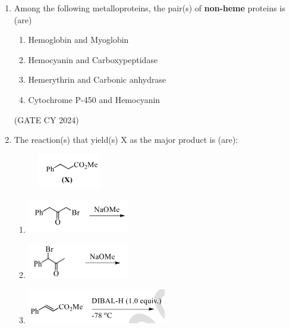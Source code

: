 \documentclass[12pt]{article}
\begin{document}
\begin{enumerate}
\item Among the following metalloproteins, the pair(s) of \textbf{non-heme} proteins is (are)

\begin{enumerate}
\item Hemoglobin and Myoglobin
\item Hemocyanin and Carboxypeptidase
\item Hemerythrin and Carbonic anhydrase
\item Cytochrome P-450 and Hemocyanin
\end{enumerate}
\hfill (GATE CY 2024)

\item The reaction(s) that yield(s) X as the major product is (are): 

\begin{figure}[H]
\centering
\includegraphics[width=0.4\columnwidth]{figs/q24.png}
\label{fig:q24}
\end{figure}

\begin{enumerate}
\item \includegraphics[width=0.4\columnwidth]{figs/q24a.png} 
\label{fig:q24a}

\item \includegraphics[width=0.4\columnwidth]{figs/q24b.png} 
\label{fig:q24b}

\item \includegraphics[width=0.4\columnwidth]{figs/q24c.png} 
\label{fig:q24c}


\end{enumerate}
\end{enumerate}
\end{document}
